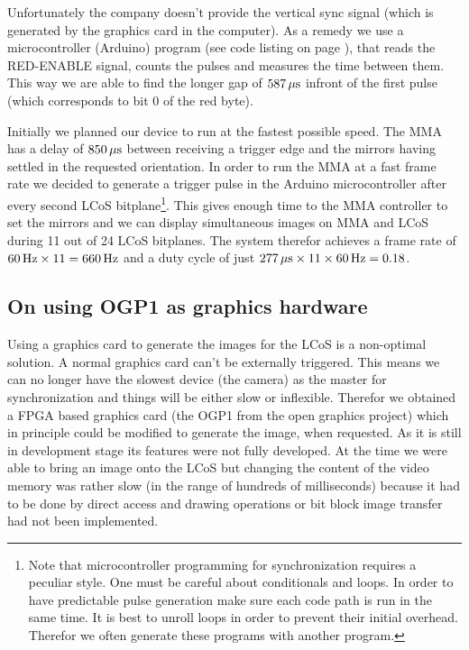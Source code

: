 Unfortunately the company doesn't provide the vertical sync signal
(which is generated by the graphics card in the computer). As a remedy
we use a microcontroller (Arduino) program (see code listing on page
\pageref{fig:arduino-vsync}), that reads the \textsf{RED-ENABLE} signal,
counts the pulses and measures the time between them. This way we are
able to find the longer gap of $\unit[587]{\mu s}$ infront of the
first pulse (which corresponds to bit 0 of the red byte).


Initially we planned our device to run at the fastest possible
speed. The MMA has a delay of $\unit[850]{\mu s}$ between receiving a
trigger edge and the mirrors having settled in the requested
orientation. In order to run the MMA at a fast frame rate we decided
to generate a trigger pulse in the Arduino microcontroller after every
second LCoS bitplane\footnote{Note that microcontroller programming
  for synchronization requires a peculiar style. One must be careful
  about conditionals and loops. In order to have predictable pulse
  generation make sure each code path is run in the same time. It is
  best to unroll loops in order to prevent their initial
  overhead. Therefor we often generate these programs with another
  program.}. This gives enough time to the MMA controller to set the
mirrors and we can display simultaneous images on MMA and LCoS during
11 out of 24 LCoS bitplanes. The system therefor achieves a frame rate
of $\unit[60]{Hz}\times11=\unit[660]{Hz}$ and a duty cycle of just
$\unit[277]{\mu s}\times11\times\unit[60]{Hz}=0.18$.

\subsection{On using OGP1 as graphics hardware}
Using a graphics card to generate the images for the LCoS is a
non-optimal solution. A normal graphics card can't be externally
triggered. This means we can no longer have the slowest device (the
camera) as the master for synchronization and things will be either
slow or inflexible. Therefor we obtained a FPGA based graphics card
(the OGP1 from the open graphics project) which in principle could be
modified to generate the image, when requested. As it is still in
development stage its features were not fully developed. At the time
we were able to bring an image onto the LCoS but changing the content
of the video memory was rather slow (in the range of hundreds of
milliseconds) because it had to be done by direct access and drawing
operations or bit block image transfer had not been implemented.

